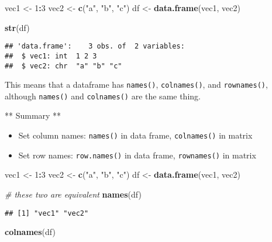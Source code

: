 \documentclass[
]{book}
\newenvironment{Shaded}{\begin{snugshade}}{\end{snugshade}}
\newcommand{\CommentTok}[1]{\textcolor[rgb]{0.56,0.35,0.01}{\textit{#1}}}
\newcommand{\DecValTok}[1]{\textcolor[rgb]{0.00,0.00,0.81}{#1}}
\newcommand{\KeywordTok}[1]{\textcolor[rgb]{0.13,0.29,0.53}{\textbf{#1}}}
\newcommand{\NormalTok}[1]{#1}
\newcommand{\OperatorTok}[1]{\textcolor[rgb]{0.81,0.36,0.00}{\textbf{#1}}}
\newcommand{\StringTok}[1]{\textcolor[rgb]{0.31,0.60,0.02}{#1}}
\providecommand{\tightlist}{%
  \setlength{\itemsep}{0pt}\setlength{\parskip}{0pt}}
\begin{document}
\begin{Shaded}
\begin{Highlighting}[]
\NormalTok{vec1 \textless{}{-}}\StringTok{ }\DecValTok{1}\OperatorTok{:}\DecValTok{3}
\NormalTok{vec2 \textless{}{-}}\StringTok{ }\KeywordTok{c}\NormalTok{(}\StringTok{"a"}\NormalTok{, }\StringTok{"b"}\NormalTok{, }\StringTok{"c"}\NormalTok{)}
\NormalTok{df \textless{}{-}}\StringTok{ }\KeywordTok{data.frame}\NormalTok{(vec1, vec2)}

\KeywordTok{str}\NormalTok{(df)}
\end{Highlighting}
\end{Shaded}

\begin{verbatim}
## 'data.frame':    3 obs. of  2 variables:
##  $ vec1: int  1 2 3
##  $ vec2: chr  "a" "b" "c"
\end{verbatim}

This means that a dataframe has \texttt{names()}, \texttt{colnames()}, and \texttt{rownames()}, although \texttt{names()} and \texttt{colnames()} are the same thing.

** Summary **

\begin{itemize}
\tightlist
\item
  Set column names: \texttt{names()} in data frame, \texttt{colnames()} in matrix
\item
  Set row names: \texttt{row.names()} in data frame, \texttt{rownames()} in matrix
\end{itemize}

\begin{Shaded}
\begin{Highlighting}[]
\NormalTok{vec1 \textless{}{-}}\StringTok{ }\DecValTok{1}\OperatorTok{:}\DecValTok{3}
\NormalTok{vec2 \textless{}{-}}\StringTok{ }\KeywordTok{c}\NormalTok{(}\StringTok{"a"}\NormalTok{, }\StringTok{"b"}\NormalTok{, }\StringTok{"c"}\NormalTok{)}
\NormalTok{df \textless{}{-}}\StringTok{ }\KeywordTok{data.frame}\NormalTok{(vec1, vec2)}

\CommentTok{\# these two are equivalent}
\KeywordTok{names}\NormalTok{(df)}
\end{Highlighting}
\end{Shaded}

\begin{verbatim}
## [1] "vec1" "vec2"
\end{verbatim}

\begin{Shaded}
\begin{Highlighting}[]
\KeywordTok{colnames}\NormalTok{(df)}
\end{Highlighting}
\end{Shaded}
\end{document}
